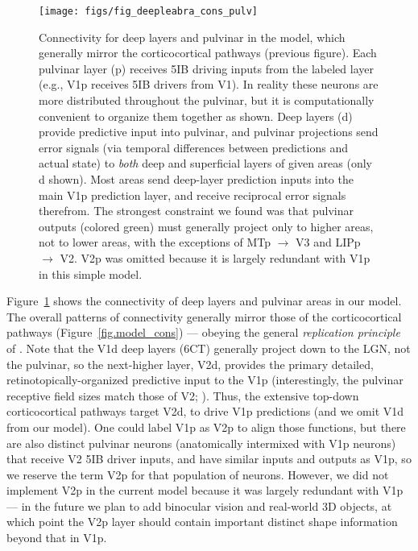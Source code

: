 \documentclass[11pt,twoside]{article}
\newif\myifpdf
\begin{document}

\begin{figure}
  \centering\texttt{[image: figs/fig\_deepleabra\_cons\_pulv]}
  \caption{\footnotesize Connectivity for deep layers and pulvinar in the model, which generally mirror the corticocortical pathways (previous figure).  Each pulvinar layer (p) receives 5IB driving inputs from the labeled layer (e.g., V1p receives 5IB drivers from V1).  In reality these neurons are more distributed throughout the pulvinar, but it is computationally convenient to organize them together as shown.  Deep layers (d) provide predictive input into pulvinar, and pulvinar projections send error signals (via temporal differences between predictions and actual state) to {\em both} deep and superficial layers of given areas (only d shown).  Most areas send deep-layer prediction inputs into the main V1p prediction layer, and receive reciprocal error signals therefrom.  The strongest constraint we found was that pulvinar outputs (colored green) must generally project only to higher areas, not to lower areas, with the exceptions of MTp $\rightarrow$ V3 and LIPp $\rightarrow$ V2.  V2p was omitted because it is largely redundant with V1p in this simple model.}
  \label{fig.model_cons_pulv}
\end{figure}

Figure~\ref{fig.model_cons_pulv} shows the connectivity of deep layers and pulvinar areas in our model.  The overall patterns of connectivity generally mirror those of the corticocortical pathways (Figure~\ref{fig.model_cons}) --- obeying the general {\em replication principle} of .  Note that the V1d deep layers (6CT) generally project down to the LGN, not the pulvinar, so the next-higher layer, V2d, provides the primary detailed, retinotopically-organized predictive input to the V1p (interestingly, the pulvinar receptive field sizes match those of V2; ).  Thus, the extensive top-down corticocortical pathways target V2d, to drive V1p predictions (and we omit V1d from our model).  One could label V1p as V2p to align those functions, but there are also distinct pulvinar neurons (anatomically intermixed with V1p neurons) that receive V2 5IB driver inputs, and have similar inputs and outputs as V1p, so we reserve the term V2p for that population of neurons.  However, we did not implement V2p in the current model because it was largely redundant with V1p --- in the future we plan to add binocular vision and real-world 3D objects, at which point the V2p layer should contain important distinct shape information beyond that in V1p.
\end{document}
